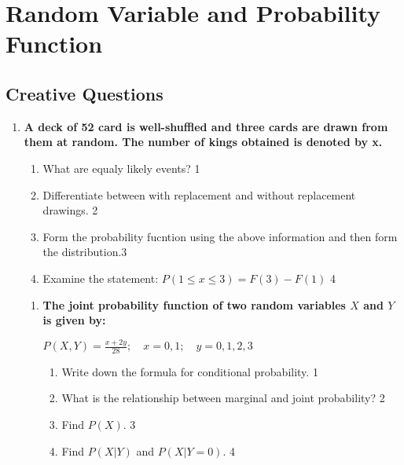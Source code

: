 \documentclass[a4paper,oneside, margin=1.4in]{book}
\begin{document}
\chapter{Random Variable and Probability Function}\label{sec:rv2}

\section{Creative Questions}

  \begin{enumerate}
  
 \item
	  \textbf{A deck of 52 card is well-shuffled and three cards are drawn from them at random. The number of kings obtained is denoted by x.} 
  
  \begin{enumerate}
    \item
	What are equaly likely events? \hfill 1
    \item
	Differentiate between with replacement and without replacement drawings. \hfill 2
    \item  
	Form the probability fucntion using the above information and then form the distribution.\hfill 3
    \item
	Examine the statement: $P(1 \le x \le 3) = F(3)-F(1)$ \hfill 4
  \end{enumerate}
  
\begin{enumerate}

  \item
  \textbf{The joint probability function of two random variables \( X \) and \( Y \) is given by:}
  
  \begin{center}
  \( \displaystyle P(X,Y) = \frac{x + 2y}{28}; \quad x = 0, 1; \quad y = 0, 1, 2, 3 \)
  \end{center}
 
  \begin{enumerate}
    \item
    	Write down the formula for conditional probability. \hfill 1
    \item
    	What is the relationship between marginal and joint probability? \hfill 2
    \item
    	Find \( P(X) \). \hfill 3
    \item
     	Find \( P(X \vert Y) \) and \( P(X \vert Y = 0) \). \hfill 4
  \end{enumerate}


\end{enumerate}
\end{enumerate}
\end{document}
